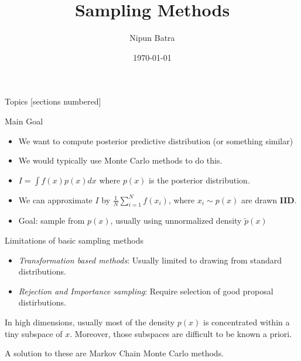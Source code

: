 \documentclass{beamer}
\begin{document}
\title{Sampling Methods}
\author{Nipun Batra}
\date{\today}
\maketitle

\begin{frame}{Topics}
    [sections numbered]
    \tableofcontents

\end{frame}

\begin{frame}{Main Goal}
    \begin{itemize}
        \item We want to compute posterior predictive distribution (or something similar)
        \pause \item We would typically use Monte Carlo methods to do this.
        \pause \item $I = \int f(x) p(x) dx$ where $p(x)$ is the posterior distribution.
        \pause \item We can approximate $I$ by $\frac{1}{N} \sum_{i=1}^N f(x_i)$, where $x_i \sim p(x)$ are drawn \textbf{IID}.
        \pause \item Goal: sample from $p(x)$, usually using unnormalized density $\tilde{p}(x)$
    \end{itemize}
\end{frame}

\begin{frame}{Limitations of basic sampling methods}
    \begin{itemize}
        \item \textit{Transformation based methods}: Usually limited to drawing from standard distributions.
        \item \textit{Rejection and Importance sampling}: Require selection of good proposal distirbutions.
    \end{itemize}
    In high dimensions, usually most of the density $p(x)$ is concentrated within a tiny subspace of $x$. Moreover, those subspaces are difficult to be known a priori.

    A solution to these are Markov Chain Monte Carlo methods.
\end{frame}
\end{document}

